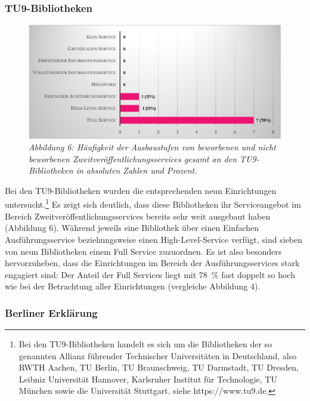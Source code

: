 \documentclass[a4paper,
fontsize=11pt,
oneside,
numbers=noperiodatend,
parskip=half-,
bibliography=totoc,
final
]{scrartcl}
\begin{document}
\hypertarget{tu9-bibliotheken}{%
\subsubsection{TU9-Bibliotheken}\label{tu9-bibliotheken}}

\begin{figure}[h!]
\centering
\includegraphics[width=.9\textwidth]{img/abb6.png}
\caption{\textit{Abbildung 6: Häufigkeit der Ausbaustufen von beworbenen und
nicht beworbenen Zweitveröffentlichungsservices gesamt an den
TU9-Bibliotheken in absoluten Zahlen und Prozent.}}
\end{figure}

Bei den TU9-Bibliotheken wurden die entsprechenden neun Einrichtungen
untersucht.\footnote{Bei den TU9-Bibliotheken handelt es sich um die
  Bibliotheken der so genannten Allianz führender Technischer
  Universitäten in Deutschland, also RWTH Aachen, TU Berlin, TU
  Braunschweig, TU Darmstadt, TU Dresden, Leibniz Universität Hannover,
  Karlsruher Institut für Technologie, TU München sowie die Universität
  Stuttgart, siehe https://www.tu9.de.} Es zeigt sich deutlich, dass
diese Bibliotheken ihr Serviceangebot im Bereich
Zweitveröffentlichungsservices bereits sehr weit ausgebaut haben
(Abbildung 6). Während jeweils eine Bibliothek über einen Einfachen
Ausführungsservice beziehungsweise einen High-Level-Service verfügt,
sind sieben von neun Bibliotheken einem Full Service zuzuordnen. Es ist
also besonders hervorzuheben, dass die Einrichtungen im Bereich der
Ausführungsservices stark engagiert sind: Der Anteil der Full Services
liegt mit 78~\% fast doppelt so hoch wie bei der Betrachtung aller
Einrichtungen (vergleiche Abbildung 4).

\hypertarget{berliner-erkluxe4rung}{%
\subsubsection{Berliner Erklärung}\label{berliner-erkluxe4rung}}
\end{document}
